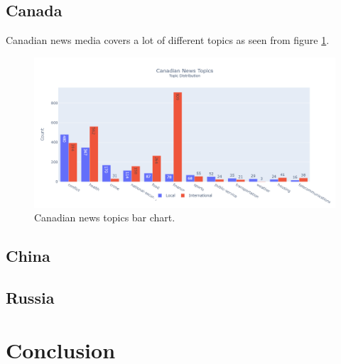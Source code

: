 \documentclass{article}
\theoremstyle{mytheoremstyle}
\theoremstyle{mytheoremstyle}
\theoremstyle{myproblemstyle}
\begin{document}
    \subsection{Canada}
    Canadian news media covers a lot of different topics as seen from figure \ref{fig:canada_topic}.
    
    \begin{figure}[ht]
        \centering
        \includegraphics[width=0.75\linewidth]{canada_barchart_topics.png}
        \caption{Canadian news topics bar chart.}
        \label{fig:canada_topic}
    \end{figure}

    
    
    \subsection{China}

    \subsection{Russia}

    \section{Conclusion}

    
    

    
\end{document}
